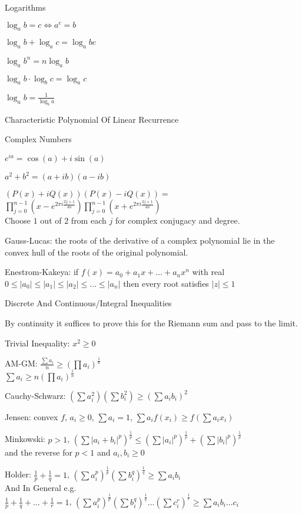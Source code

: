 Logarithms

$\log_a b=c \iff a^c=b$

$\log_a b+\log_a c=\log_a bc$

$\log_a b^n=n\log_a b$

$\log_a b \cdot \log_b c=\log_a c$

$\log_a b=\frac{1}{\log_b a}$

Characteristic Polynomial Of Linear Recurrence

Complex Numbers

$e^{ia}=\cos(a)+i\sin(a)$

$a^2+b^2=(a+ib)(a-ib)$

$(P(x)+iQ(x))(P(x)-iQ(x)) =$ \\
$\prod_{j=0}^{n-1} \left(x-e^{2 \pi i \frac{2j+1}{4n}} \right) \prod_{j=0}^{n-1} \left(x+e^{2 \pi i \frac{2j+1}{4n}} \right)$ \\
Choose $1$ out of $2$ from each $j$ for complex conjugacy and degree.

Gauss-Lucas: the roots of the derivative of a complex polynomial lie in the convex hull of the roots of the original polynomial.

Enestrom-Kakeya: if $f(x)=a_0+a_1 x+\dots+a_n x^n$ with real $0 \le |a_0| \le |a_1| \le |a_2| \le \dots \le |a_n|$ then every root satisfies $|z| \le 1$

Discrete And Continuous/Integral Inequalities

By continuity it suffices to prove this for the Riemann sum and pass to the limit.

Trivial Inequality: $x^2 \ge 0$

AM-GM: $\frac{\sum a_i}{n} \ge \left(\prod a_i \right)^{\frac{1}{n}}$ \\
$\sum a_i \ge n \left(\prod a_i \right)^{\frac{1}{n}}$

Cauchy-Schwarz: $\left(\sum a_i^2 \right)\left(\sum b_i^2 \right) \ge \left(\sum a_i b_i \right)^2$

Jensen: convex $f$, $a_i \ge 0$, $\sum a_i = 1$, $\sum a_i f(x_i) \ge f\left(\sum a_i x_i \right)$

Minkowski: $p>1$, $(\sum |a_i+b_i|^p)^{\frac{1}{p}} \le (\sum |a_i|^p)^{\frac{1}{p}} + (\sum |b_i|^p)^{\frac{1}{p}}$ \\
and the reverse for $p<1$ and $a_i,b_i \ge 0$

Holder: $\frac{1}{p}+\frac{1}{q}=1$, $\left(\sum a_i^p \right)^{\frac{1}{p}} \left(\sum b_i^q \right)^{\frac{1}{q}} \ge \sum a_i b_i$ \\
And In General e.g. \\
$\frac{1}{p}+\frac{1}{q}+\dots+\frac{1}{r}=1$, $\left(\sum a_i^p \right)^{\frac{1}{p}} \left(\sum b_i^q \right)^{\frac{1}{q}} \dots \left(\sum c_i^r \right)^{\frac{1}{r}} \ge \sum a_i b_i \dots c_i$

